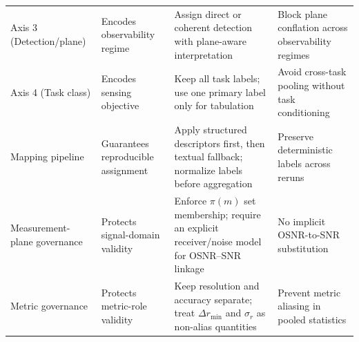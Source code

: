 \documentclass[letterpaper,journal]{IEEEtran}
\begin{document}
\begin{table}[!t]
\begin{tabularx}{\textwidth}{@{}>{\raggedright\arraybackslash}p{2.15cm} >{\raggedright\arraybackslash}X >{\raggedright\arraybackslash}X >{\raggedright\arraybackslash}X@{}}
        Axis 3 (Detection/plane)                                                                                  &
        Encodes observability regime                                                                              &
        Assign direct or coherent detection with plane-aware interpretation                                       &
        Block plane conflation across observability regimes                                                         \\

        Axis 4 (Task class)                                                                                       &
        Encodes sensing objective                                                                                 &
        Keep all task labels; use one primary label only for tabulation                                           &
        Avoid cross-task pooling without task conditioning                                                          \\

        Mapping pipeline                                                                                          &
        Guarantees reproducible assignment                                                                        &
        Apply structured descriptors first, then textual fallback; normalize labels before aggregation            &
        Preserve deterministic labels across reruns                                                                 \\

        Measurement-plane governance                                                                              &
        Protects signal-domain validity                                                                           &
        Enforce $\pi(m)$ set membership; require an explicit receiver/noise model for OSNR--SNR linkage           &
        No implicit OSNR-to-SNR substitution                                                                        \\

        Metric governance                                                                                         &
        Protects metric-role validity                                                                             &
        Keep resolution and accuracy separate; treat $\Delta r_{\min}$ and $\sigma_r$ as non-alias quantities     &
        Prevent metric aliasing in pooled statistics                                                                \\


\end{tabularx}
\end{table}
\end{document}
